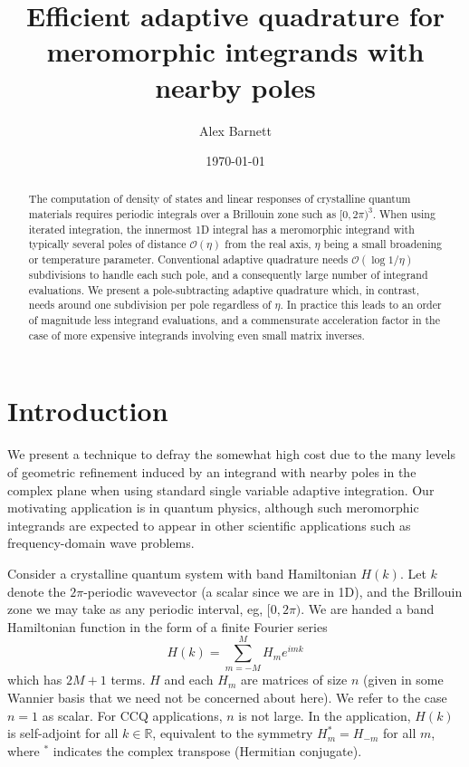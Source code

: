 \documentclass[11pt]{article}
\newcommand{\be}{\begin{equation}}
\newcommand{\ee}{\end{equation}}
\newcommand{\bigO}{{\mathcal O}}
\newcommand{\R}{\mathbb{R}}
\begin{document}
\title{Efficient adaptive quadrature for meromorphic integrands with nearby poles}
\author{Alex Barnett}
\date{\today}
\maketitle
\begin{abstract}
  The computation of density of states and linear responses of crystalline
  quantum materials requires periodic integrals over a Brillouin zone such as $[0,2\pi)^3$.
  When using iterated integration,
  the innermost 1D integral has a meromorphic integrand
  with typically several poles of distance $\bigO(\eta)$ from the real axis,
  $\eta$ being a small broadening or temperature parameter.
  Conventional adaptive quadrature needs $\bigO(\log 1/\eta)$ subdivisions to
  handle each such pole, and a consequently large number of integrand evaluations.
  We present a pole-subtracting adaptive quadrature which, in contrast,
  needs around one subdivision per pole regardless of $\eta$.
  In practice this leads to an order of magnitude less integrand evaluations,
  and a commensurate acceleration factor in the case of more expensive integrands
  involving even small matrix inverses.
\end{abstract}

\section{Introduction}

We present a technique to defray the somewhat high
cost due to the many levels of geometric refinement induced by
an integrand with nearby poles in the complex plane
when using standard single variable adaptive integration.
Our motivating application is in quantum physics, although such meromorphic
integrands are expected to appear in other scientific applications such as
frequency-domain wave problems.

Consider a crystalline quantum system with band Hamiltonian $H(k)$.
Let $k$ denote the $2\pi$-periodic wavevector (a scalar since we are in 1D), and
the Brillouin zone we may take as any periodic interval, eg, $[0,2\pi)$.
We are handed a band Hamiltonian function in the form of a finite Fourier
series
\be
H(k) = \sum_{m=-M}^M H_m e^{imk}
\label{Hk}
\ee
which has $2M+1$ terms. $H$ and each $H_m$ are matrices of size $n$
(given in some Wannier basis that we need not be concerned about here).
We refer to the case $n=1$ as scalar.
For CCQ applications, $n$ is not large.
In the application, $H(k)$ is self-adjoint for all $k\in\R$,
equivalent to the symmetry $H_m^* = H_{-m}$ for all $m$, where
$^*$ indicates the complex transpose (Hermitian conjugate).
\end{document}
